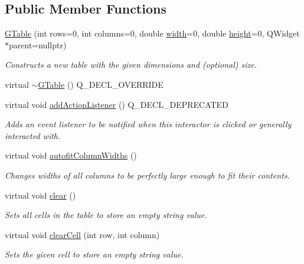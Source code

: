 \subsection*{Public Member Functions}
\begin{DoxyCompactItemize}
\item 
\mbox{\hyperlink{classGTable_a5ceea9546881f429ad4601366908848d}{G\+Table}} (int rows=0, int columns=0, double \mbox{\hyperlink{classGTable_ad72663daf610f2a0833a2fc3d78e4fdf}{width}}=0, double \mbox{\hyperlink{classGTable_ad3774f6419003470f54fd495124ef51f}{height}}=0, Q\+Widget $\ast$parent=nullptr)
\begin{DoxyCompactList}\small\item\em Constructs a new table with the given dimensions and (optional) size. \end{DoxyCompactList}\item 
virtual \mbox{\hyperlink{classGTable_a2b0d93c5b6064d84588596fba9c3b0bc}{$\sim$\+G\+Table}} () Q\+\_\+\+D\+E\+C\+L\+\_\+\+O\+V\+E\+R\+R\+I\+DE
\item 
virtual void \mbox{\hyperlink{classGInteractor_a02f20ea6edfa0671f31c4c648a253833}{add\+Action\+Listener}} () Q\+\_\+\+D\+E\+C\+L\+\_\+\+D\+E\+P\+R\+E\+C\+A\+T\+ED
\begin{DoxyCompactList}\small\item\em Adds an event listener to be notified when this interactor is clicked or generally interacted with. \end{DoxyCompactList}\item 
virtual void \mbox{\hyperlink{classGTable_afaf36ccb6a75432b5f5463613ef01ef4}{autofit\+Column\+Widths}} ()
\begin{DoxyCompactList}\small\item\em Changes widths of all columns to be perfectly large enough to fit their contents. \end{DoxyCompactList}\item 
virtual void \mbox{\hyperlink{classGTable_ac8bb3912a3ce86b15842e79d0b421204}{clear}} ()
\begin{DoxyCompactList}\small\item\em Sets all cells in the table to store an empty string value. \end{DoxyCompactList}\item 
virtual void \mbox{\hyperlink{classGTable_ab7bffbf52806e438ac155886079d9bf6}{clear\+Cell}} (int row, int column)
\begin{DoxyCompactList}\small\item\em Sets the given cell to store an empty string value. \end{DoxyCompactList}\item 

\end{DoxyCompactItemize}

